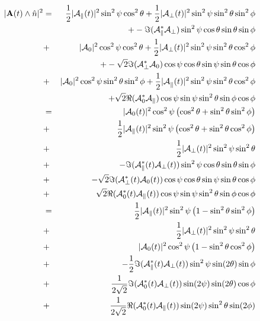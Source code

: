 \documentclass[a4paper,9pt,twoside]{article}
\begin{document}
\begin{eqnarray}
  |{ \bf A}(t) \wedge \hat{n}|^2 &=& 
                                  \frac{1}{2} |{\cal A}_\parallel(t)|^2 \sin^2\psi \cos^2\theta  +  \frac{1 }{2}|{\cal A}_\perp(t)|^2\sin^2\psi\sin^2\theta\sin^2\phi  \\
                              &&+     -\Im({\cal A}_\parallel^*{\cal A}_\perp)\sin^2\psi\cos\theta\sin\theta\sin\phi  \\
                              &+&     |{\cal A}_0|^2 \cos^2\psi\cos^2\theta  + \frac{1}{2} |{\cal A}_\perp(t)|^2\sin^2\psi \sin^2\theta\cos^2\phi \\
                              &&+     -\sqrt{2}\Im({\cal A}_\perp^* {\cal A}_0 )\cos\psi\cos\theta\sin\psi\sin\theta\cos\phi \\
                              &+&     |{\cal A}_0|^2 \cos^2\psi\sin^2\theta\sin^2\phi  + \frac{1}{2}{|\cal A}_\parallel(t)|^2 \sin^2\psi \sin^2\theta\cos^2\phi       \\
                              &&+     \sqrt{2}\Re({\cal A}_0^*{\cal A}_\parallel  )\cos\psi\sin\psi\sin^2\theta\sin\phi\cos\phi\\
                              &=&  |{\cal A}_0(t)|^2 \cos^2\psi\left( \cos^2\theta  +  \sin^2\theta\sin^2\phi\right) \\
                              &+& \frac{1}{2}|{\cal A}_\parallel(t)|^2 \sin^2\psi \left( \cos^2\theta + \sin^2\theta\cos^2\phi    \right)  \\
                              &+&\frac{1}{2}|{\cal A}_\perp(t)|^2\sin^2\psi\sin^2\theta \\
                              &+&     -\Im({\cal A}_\parallel^*(t){\cal A}_\perp(t))\sin^2\psi\cos\theta\sin\theta\sin\phi  \\
                              &+&     -\sqrt{2}\Im({\cal A}_\perp^*(t) {\cal A}_0(t) )\cos\psi\cos\theta\sin\psi\sin\theta\cos\phi \\
                              &+&     \sqrt{2}\Re({\cal A}_0^*(t){\cal A}_\parallel(t)  )\cos\psi\sin\psi\sin^2\theta\sin\phi\cos\phi\\
                              &=&\frac{1}{2}|{\cal A}_\parallel(t)|^2 \sin^2\psi \left( 1 -  \sin^2\theta\sin^2\phi    \right)  \\
                              &+&\frac{1}{2}|{\cal A}_\perp(t)|^2\sin^2\psi\sin^2\theta \\
                              &+&   |{\cal A}_0(t)|^2 \cos^2\psi\left( 1  -  \sin^2\theta\cos^2\phi\right) \\
                              &+&     -\frac{1}{2}\Im({\cal A}_\parallel^*(t){\cal A}_\perp(t))\sin^2\psi\sin(2\theta)\sin\phi  \\
                              &+&     \frac{1}{2\sqrt{2}}\Im({\cal A}_0^*(t) {\cal A}_\perp(t) ) \sin(2\psi)\sin(2\theta)\cos\phi \\
                              &+&     \frac{1}{2\sqrt{2}}\Re({\cal A}_0^*(t) {\cal A}_\parallel(t))\sin(2\psi)\sin^2\theta\sin(2\phi)
\end{eqnarray}
\end{document}
